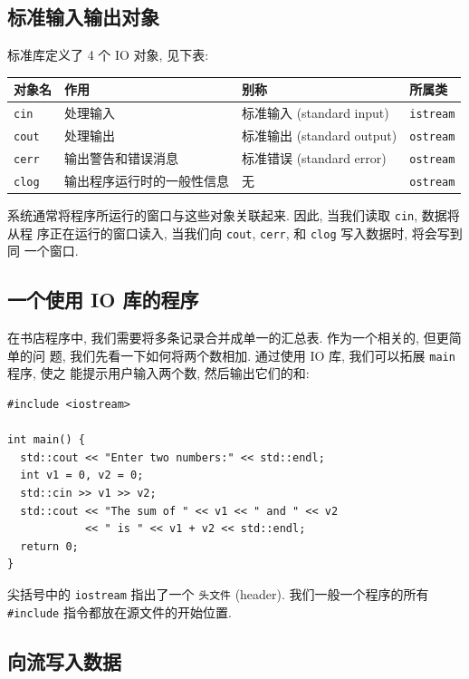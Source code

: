 \documentclass[lang=cn]{elegantbook}
\begin{document}
\subsection{标准输入输出对象}
\label{sec:orge52d0bb}

标准库定义了 4 个 IO 对象, 见下表:

\begin{table}[htbp]
\label{4 个 IO 对象}
\centering
\begin{tabular}{llll}
对象名 & 作用 & 别称 & 所属类\\
\hline
\texttt{cin} & 处理输入 & 标准输入 (standard input) & \texttt{istream}\\
\texttt{cout} & 处理输出 & 标准输出 (standard output) & \texttt{ostream}\\
\texttt{cerr} & 输出警告和错误消息 & 标准错误 (standard error) & \texttt{ostream}\\
\texttt{clog} & 输出程序运行时的一般性信息 & 无 & \texttt{ostream}\\
\end{tabular}
\end{table}

系统通常将程序所运行的窗口与这些对象关联起来. 因此, 当我们读取 \texttt{cin}, 数据将从程
序正在运行的窗口读入, 当我们向 \texttt{cout}, \texttt{cerr}, 和 \texttt{clog} 写入数据时, 将会写到同
一个窗口.

\subsection{一个使用 IO 库的程序}
\label{sec:orga776e5c}

在书店程序中, 我们需要将多条记录合并成单一的汇总表. 作为一个相关的, 但更简单的问
题, 我们先看一下如何将两个数相加. 通过使用 IO 库, 我们可以拓展 \texttt{main} 程序, 使之
能提示用户输入两个数, 然后输出它们的和:

\begin{verbatim}
#include <iostream>

int main() {
  std::cout << "Enter two numbers:" << std::endl;
  int v1 = 0, v2 = 0;
  std::cin >> v1 >> v2;
  std::cout << "The sum of " << v1 << " and " << v2
            << " is " << v1 + v2 << std::endl;
  return 0;
}
\end{verbatim}

尖括号中的 \texttt{iostream} 指出了一个 \texttt{头文件} (header). 我们一般一个程序的所有
\texttt{\#include} 指令都放在源文件的开始位置.

\subsection{向流写入数据}
\label{sec:orgab98561}
\end{document}
